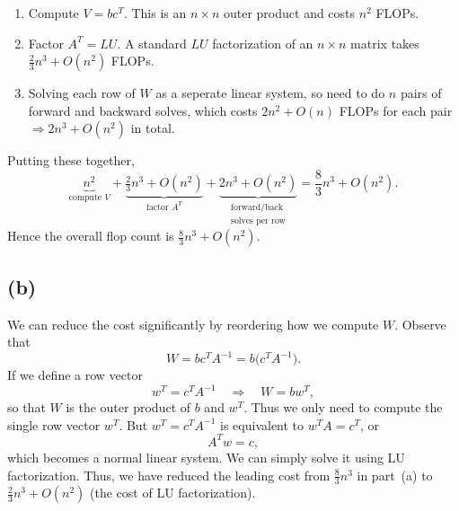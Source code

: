 \documentclass{article}
\begin{document}
\begin{enumerate}
    \item Compute $V = bc^T$.  This is an $n\times n$ outer product and costs $n^2$ FLOPs.
    \item Factor $A^T = LU$. A standard $LU$ factorization of an $n \times n$ matrix takes $\tfrac{2}{3}n^3 + O(n^2)$ FLOPs.
    \item Solving each row of $W$ as a seperate linear system, so need to do $n$ pairs of forward and backward solves, which costs $2n^2+O(n)$ FLOPs for each pair $\Longrightarrow 2n^3+O(n^2)$ in total.
\end{enumerate}
Putting these together,
$$
    \boxed{
    \underbrace{n^2}_{\text{compute }V}
    +
    \underbrace{\tfrac{2}{3}n^3+O(n^2)}_{\text{factor }A^T}
    +
    \underbrace{2n^3+O(n^2)}_{\substack{\text{forward/back}\\\text{solves per row}}}
    =
    \frac{8}{3}n^3
    +O(n^2)
    }.
$$
Hence the overall flop count is $\frac{8}{3}n^3 + O(n^2)$.

\subsection*{(b)}
We can reduce the cost significantly by reordering how we compute $W$.
Observe that
$$
    W
    =
    bc^TA^{-1}
    =
    b
    \bigl(c^TA^{-1}\bigr).
$$
If we define a row vector
$$
    w^T = c^TA^{-1}
    \quad\Longrightarrow\quad
    W = bw^T,
$$
so that $W$ is the outer product of $b$ and $w^T$.
Thus we only need to compute the single row vector $w^T$.
But $w^T = c^TA^{-1}$ is equivalent to $w^T A = c^T$, or
$$
    A^T w = c,
$$
which becomes a normal linear system. We can simply solve it using LU factorization. Thus, we have reduced the leading cost from $\tfrac{8}{3}n^3$ in part~(a) to $\tfrac{2}{3}n^3+O(n^2)$ (the cost of LU factorization).

\newpage
\end{document}
